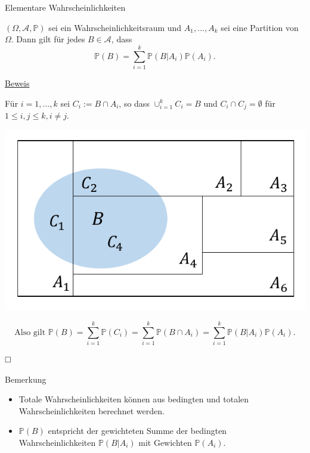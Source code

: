 \documentclass[
  8pt,
  ignorenonframetext,
]{beamer}
\providecommand{\tightlist}{%
  \setlength{\itemsep}{0pt}\setlength{\parskip}{0pt}}
\begin{document}
\begin{frame}{Elementare Wahrscheinlichkeiten}
\protect\hypertarget{elementare-wahrscheinlichkeiten}{}
\small
\begin{theorem}
\normalfont
\justifying
$(\Omega,\mathcal{A},\mathbb{P})$ sei ein Wahrscheinlichkeitsraum und $A_1, ...,A_k$
sei eine Partition von $\Omega$. Dann gilt 
für jedes $B \in \mathcal{A}$, dass
\begin{equation}
\mathbb{P}(B) = \sum_{i=1}^k \mathbb{P}(B|A_i)\mathbb{P}(A_i).
\end{equation}
\end{theorem}
\vspace{-1mm}

\footnotesize

\underline{Beweis}

Für \(i = 1,...,k\) sei \(C_i := B \cap A_i\), so dass
\(\cup_{i=1}^k C_i = B\) und \(C_i \cap C_j = \emptyset\) für
\(1 \le i,j \le k,i \neq j\).

\begin{minipage}{.29\linewidth}
\begin{center}

\begin{center}\includegraphics[width=0.7\linewidth]{3_Abbildungen/wtfi_3_partition} \end{center}
\end{center}
\end{minipage}
\begin{minipage}{.69\linewidth}
\begin{equation*}
\mbox{Also gilt }
\mathbb{P}(B)
= \sum_{i=1}^k \mathbb{P}(C_i)
= \sum_{i=1}^k \mathbb{P}(B \cap A_i)
= \sum_{i=1}^k \mathbb{P}(B|A_i)\mathbb{P}(A_i).
\end{equation*}
\end{minipage}

\(\hfill \Box\)

\vspace{-1mm}

Bemerkung

\begin{itemize}
\tightlist
\item
  Totale Wahrscheinlichkeiten können aus bedingten und totalen
  Wahrscheinlichkeiten berechnet werden.
\item
  \(\mathbb{P}(B)\) entspricht der gewichteten Summe der bedingten
  Wahrscheinlichkeiten \(\mathbb{P}(B|A_i)\) mit Gewichten
  \(\mathbb{P}(A_i)\).
\end{itemize}
\end{frame}
\end{document}
